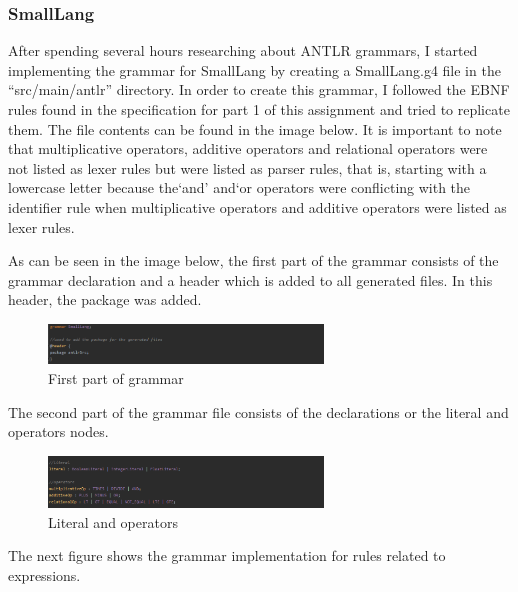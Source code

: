 \documentclass{article}
\newcommand{\quotes}[1]{``#1''}
\begin{document}
			\subsubsection{SmallLang}
			
			After spending several hours researching about ANTLR grammars, I started implementing the grammar for SmallLang by creating a SmallLang.g4 file in the \quotes{src/main/antlr} directory. In order to create this grammar, I followed the EBNF rules found in the specification for part 1 of this assignment and tried to replicate them. The file contents can be found in the image below. It is important to note that multiplicative operators, additive operators and relational operators were not listed as lexer rules but were listed as parser rules, that is, starting with a lowercase letter because the`and' and`or operators were conflicting with the identifier rule when multiplicative operators and additive operators were listed as lexer rules.
			
			
			\noindent As can be seen in the image below, the first part of the grammar consists of the grammar declaration and a header which is added to all generated files. In this header, the package was added.
	
			
			
								\begin{figure}[H]
					\centering
			 			\includegraphics[width=0.65\textwidth]{antlrv1_1.png}
			  			\caption{First part of grammar}
			  			\label{fig:antlrv1_1}
					\end{figure}
					
						
			\noindent The second part of the grammar file consists of the declarations or the literal and operators nodes.
			
						\begin{figure}[H]
					\centering
			 			\includegraphics[width=0.65\textwidth]{antlrv1_2.png}
			  			\caption{Literal and operators}
			  			\label{fig:antlrv1_2}
					\end{figure}
					
					\noindent The next figure shows the grammar implementation for rules related to expressions.
			
\end{document}
